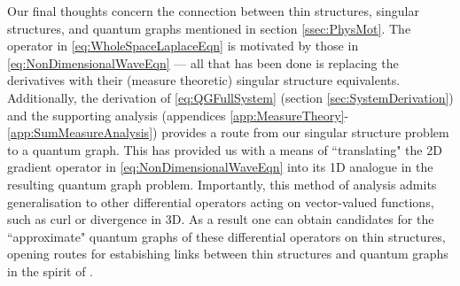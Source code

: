 Our final thoughts concern the connection between thin structures, singular structures, and quantum graphs mentioned in section \ref{ssec:PhysMot}.
The operator in \eqref{eq:WholeSpaceLaplaceEqn} is motivated by those in \eqref{eq:NonDimensionalWaveEqn} --- all that has been done is replacing the derivatives with their (measure theoretic) singular structure equivalents.
Additionally, the derivation of \eqref{eq:QGFullSystem} (section \ref{sec:SystemDerivation}) and the supporting analysis (appendices \ref{app:MeasureTheory}-\ref{app:SumMeasureAnalysis}) provides a route from our singular structure problem to a quantum graph.
This has provided us with a means of ``translating" the 2D gradient operator in \eqref{eq:NonDimensionalWaveEqn} into its 1D analogue in the resulting quantum graph problem.
Importantly, this method of analysis admits generalisation to other differential operators acting on vector-valued functions, such as curl or divergence in 3D.
As a result one can obtain candidates for  the ``approximate" quantum graphs of these differential operators on thin structures, opening routes for estabishing links between thin structures and quantum graphs in the spirit of \cite{exner2005convergence, kuchment2001convergence}.